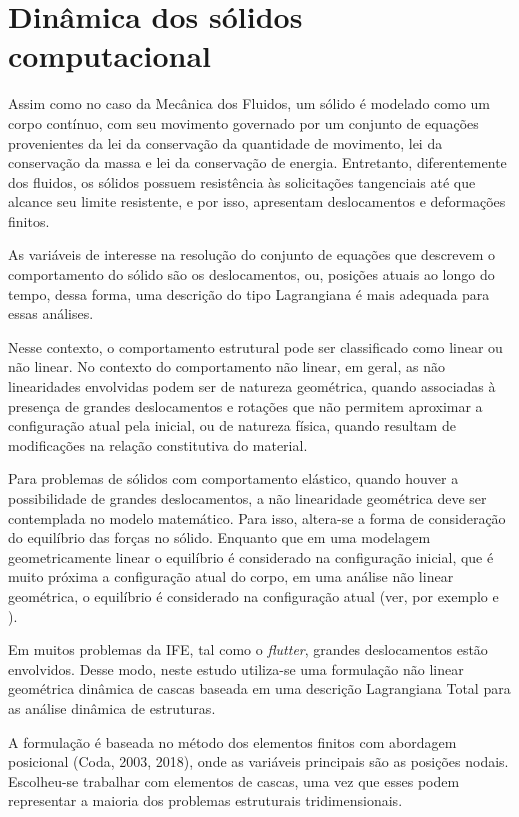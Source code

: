 \chapter[Dinâmica dos sólidos computacional]{Dinâmica dos sólidos computacional} \label{capitulo:Cap4}

Assim como no caso da Mecânica dos Fluidos, um sólido é modelado como um corpo contínuo, com seu movimento governado por um conjunto de equações provenientes da lei da conservação da quantidade de movimento, lei da conservação da massa e lei da conservação de energia. Entretanto, diferentemente dos fluidos, os sólidos possuem resistência às solicitações tangenciais até que alcance seu limite resistente, e por isso, apresentam deslocamentos e deformações finitos. 

As variáveis de interesse na resolução do conjunto de equações que descrevem o comportamento do sólido são os deslocamentos, ou, posições atuais ao longo do tempo, dessa forma, uma descrição do tipo Lagrangiana é mais adequada para essas análises.

Nesse contexto, o comportamento estrutural pode ser classificado como linear ou não linear. No contexto do comportamento não linear, em geral, as não linearidades envolvidas podem ser de natureza geométrica, quando associadas à presença de grandes deslocamentos e rotações que não permitem aproximar a configuração atual pela inicial, ou de natureza física, quando resultam de modificações na relação constitutiva do material.

Para problemas de sólidos com comportamento elástico, quando houver a possibilidade de grandes deslocamentos, a não linearidade geométrica deve ser contemplada no modelo matemático. Para isso, altera-se a forma de consideração do equilíbrio das forças no sólido. Enquanto que em uma modelagem geometricamente linear o equilíbrio é considerado na configuração inicial, que é muito próxima a configuração atual do corpo, em uma análise não linear geométrica, o equilíbrio é considerado na configuração atual (ver, por exemplo   e ).

Em muitos problemas da IFE, tal como o \textit{flutter}, grandes deslocamentos estão envolvidos. Desse modo, neste estudo utiliza-se uma formulação não linear geométrica dinâmica de cascas baseada em uma descrição Lagrangiana Total para as análise dinâmica de estruturas. 

A formulação é baseada no método dos elementos finitos com abordagem posicional (Coda, 2003, 2018), onde as variáveis principais são as posições nodais. Escolheu-se trabalhar com elementos de cascas, uma vez que esses podem representar a maioria dos problemas estruturais tridimensionais. 

